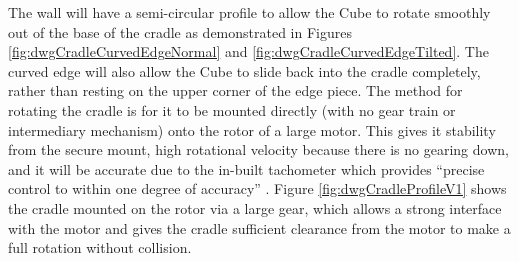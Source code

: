 \documentclass{report}
\begin{document}
	
	The wall will have a semi-circular profile to allow the Cube to rotate smoothly out of the base of the cradle as demonstrated in Figures \ref{fig:dwgCradleCurvedEdgeNormal} and \ref{fig:dwgCradleCurvedEdgeTilted}. The curved edge will also allow the Cube to slide back into the cradle completely, rather than resting on the upper corner of the edge piece. The method for rotating the cradle is for it to be mounted directly (with no gear train or intermediary mechanism) onto the rotor of a large motor. This gives it stability from the secure mount, high rotational velocity because there is no gearing down, and it will be accurate due to the in-built tachometer which provides \enquote{precise control to within one degree of accuracy} \cite{Lego}. Figure \ref{fig:dwgCradleProfileV1} shows the cradle mounted on the rotor via a large gear, which allows a strong interface with the motor and gives the cradle sufficient clearance from the motor to make a full rotation without collision.
    
\end{document}
